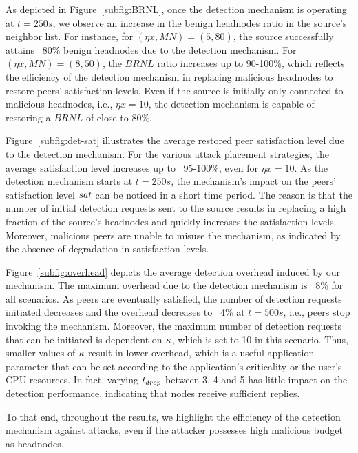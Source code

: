 As depicted in Figure~\ref{subfig:BRNL}, once the detection mechanism is operating at $t=250s$, we observe an increase in the benign headnodes ratio in the source's neighbor list.
For instance, for $(\eta x, MN)=(5, 80)$, the source successfully attains ~80\% benign headnodes due to the detection mechanism.
For $(\eta x, MN)=(8, 50)$, the $BRNL$ ratio increases up to 90-100\%, which reflects the efficiency of the detection mechanism in replacing malicious headnodes to restore peers' satisfaction levels. 
Even if the source is initially only connected to malicious headnodes, i.e., $\eta x=10$, the detection mechanism is capable of restoring a $BRNL$ of close to 80\%. 

Figure~\ref{subfig:det-sat} illustrates the average restored peer satisfaction level due to the detection mechanism.
For the various attack placement strategies, the average satisfaction level increases up to ~95-100\%, even for $\eta x=10$.
As the detection mechanism starts at $t=250s$, the mechanism's impact on the peers' satisfaction level $sat$ can be noticed in a short time period.
The reason is that the number of initial detection requests sent to the source results in replacing a high fraction of the source's headnodes and quickly increases the satisfaction levels. 
Moreover, malicious peers are unable to misuse the mechanism, as indicated by the absence of degradation in satisfaction levels. 

Figure~\ref{subfig:overhead} depicts the average detection overhead induced by our mechanism. 
The maximum overhead due to the detection mechanism is ~8\% for all scenarios.
As peers are eventually satisfied, the number of detection requests initiated decreases and the overhead decreases to ~4\% at $t=500s$, i.e., peers stop invoking the mechanism.
Moreover, the maximum number of detection requests that can be initiated is dependent on $\kappa$, which is set to 10 in this scenario.
Thus, smaller values of $\kappa$ result in lower overhead, which is a useful application parameter that can be set according to the application's criticality or the user's CPU resources.
In fact, varying $t_{drop}$ between 3, 4 and 5 has little impact on the detection performance, indicating that nodes receive sufficient replies.

To that end, throughout the results, we highlight the efficiency of the detection mechanism against \drop attacks, even if the attacker possesses high malicious budget as headnodes.



